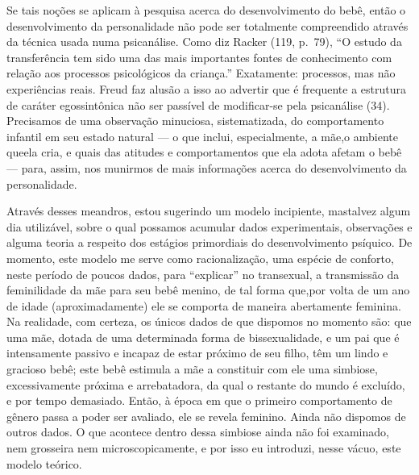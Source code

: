 Se tais noções se aplicam à pesquisa acerca do desenvolvimento do
bebê, então o desenvolvimento da personalidade não pode ser totalmente
compreendido através da técnica usada numa psicanálise. Como diz Racker\idxracker{}
(119, p.~79), ``O estudo da transferência\idxtransf{} tem sido uma
das mais importantes fontes de conhecimento com relação aos processos
psicológicos da criança.'' Exatamente: processos, mas não
experiências reais. Freud\idxfreudestru{} faz alusão a isso ao advertir que é frequente
 a estrutura de caráter egossintônica\idxinfanego{} não ser passível de modificar-se
pela psicanálise (34). Precisamos de uma observação minuciosa,
sistematizada, do comportamento infantil em seu estado natural --- o
que inclui, especialmente, a mãe,\idxmaestran[|(] o ambiente que\idxtransesimb[|(] ela cria, e quais das
atitudes e comportamentos que ela adota afetam o bebê --- para,
assim, nos munirmos de mais informações acerca do desenvolvimento da
personalidade.

Através desses meandros, estou sugerindo um modelo incipiente, mas\idxtranseetio[|(]
talvez algum dia utilizável, sobre o qual possamos acumular dados
experimentais, observações e alguma teoria a respeito dos estágios
primordiais do desenvolvimento psíquico. De momento, este modelo me
serve como racionalização, uma espécie de conforto, neste período de
poucos dados, para ``explicar'' no
transexual, a transmissão da feminilidade da mãe\idxpaisfilh{} para seu bebê menino,
de tal forma que,\idxmaesfilh[|(] por volta de um ano de idade (aproximadamente) ele se
comporta de maneira abertamente feminina. Na realidade, com certeza,
os únicos dados de que dispomos no momento são: que uma mãe, dotada de
uma determinada forma de bissexualidade,\idxmaesbiss{} e um pai que é intensamente
passivo e incapaz de estar próximo de seu filho, têm um lindo e
gracioso bebê; este bebê estimula a mãe a constituir com ele uma
simbiose, excessivamente próxima e arrebatadora, da qual o restante do
mundo é excluído, e por tempo demasiado. Então, à época em que o
primeiro comportamento de gênero passa a poder ser avaliado, ele se
revela feminino. Ainda não dispomos de outros dados. O que acontece
dentro dessa simbiose ainda não foi examinado, nem grosseira nem
microscopicamente, e por isso eu introduzi, nesse vácuo, este modelo
teórico.

